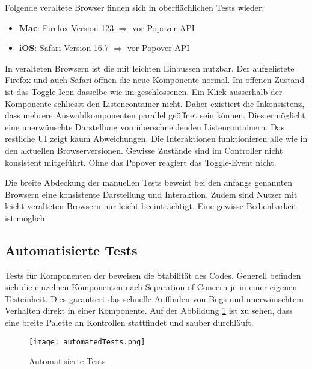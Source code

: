 Folgende veraltete Browser finden sich in oberflächlichen Tests wieder: 

\begin{itemize}
    \item \textbf{Mac}: Firefox Version 123 $\Rightarrow$ vor Popover-API
    \item \textbf{iOS}: Safari Version 16.7 $\Rightarrow$ vor Popover-API
\end{itemize}

In veralteten Browsern ist die  mit leichten Einbussen nutzbar. 
Der aufgelistete Firefox und auch Safari öffnen die neue Komponente normal. 
Im offenen Zustand ist das Toggle-Icon dasselbe wie im geschlossenen. 
Ein Klick ausserhalb der Komponente schliesst den Listencontainer nicht. 
Daher existiert die Inkonsistenz, dass mehrere Auswahlkomponenten parallel geöffnet sein können. 
Dies ermöglicht eine unerwünschte Darstellung von überschneidenden Listencontainern. 
Das restliche UI zeigt kaum Abweichungen. 
Die Interaktionen funktionieren alle wie in den aktuellen Browserversionen. 
Gewisse Zustände sind im Controller nicht konsistent mitgeführt. 
Ohne das Popover reagiert das Toggle-Event nicht.

Die breite Abdeckung der manuellen Tests beweist bei den anfangs genannten Browsern eine konsistente Darstellung und Interaktion. 
Zudem sind Nutzer mit leicht veralteten Browsern nur leicht beeinträchtigt. 
Eine gewisse Bedienbarkeit ist möglich. 


\subsection{Automatisierte Tests}
\label{sec:automatedTests}

Tests für Komponenten der  beweisen die Stabilität des Codes. 
Generell befinden sich die einzelnen Komponenten nach Separation of Concern je in einer eigenen Testeinheit. 
Dies garantiert das schnelle Auffinden von Bugs und unerwünschtem Verhalten direkt in einer Komponente. 
Auf der Abbildung \ref{img:automatedTests} ist zu sehen, dass eine breite Palette an Kontrollen stattfindet und sauber durchläuft. 

\begin{figure}[!htb]
    \centering
    \texttt{[image: automatedTests.png]}
    \caption{\centering Automatisierte Tests}
    \label{img:automatedTests}
\end{figure}

